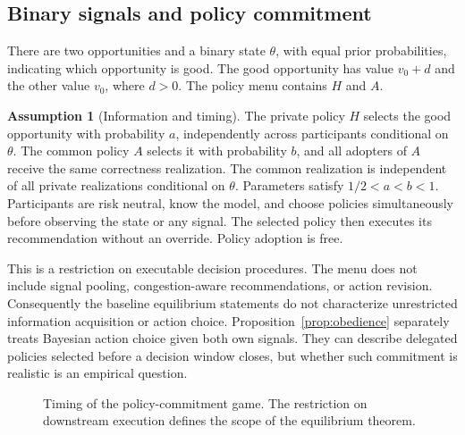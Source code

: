 \documentclass[11pt,a4paper]{article}
\theoremstyle{definition}
\newtheorem{assumption}[theorem]{Assumption}
\theoremstyle{remark}
\begin{document}
\subsection{Binary signals and policy commitment}
There are two opportunities and a binary state $\theta$, with equal prior probabilities, indicating which opportunity is good. The good opportunity has value $v_0+d$ and the other value $v_0$, where $d>0$. The policy menu contains $H$ and $A$.
\begin{assumption}[Information and timing]\label{ass:timing}
The private policy $H$ selects the good opportunity with probability $a$, independently across participants conditional on $\theta$. The common policy $A$ selects it with probability $b$, and all adopters of $A$ receive the same correctness realization. The common realization is independent of all private realizations conditional on $\theta$. Parameters satisfy $1/2<a<b<1$. Participants are risk neutral, know the model, and choose policies simultaneously before observing the state or any signal. The selected policy then executes its recommendation without an override. Policy adoption is free.
\end{assumption}
This is a restriction on executable decision procedures. The menu does not include signal pooling, congestion-aware recommendations, or action revision. Consequently the baseline equilibrium statements do not characterize unrestricted information acquisition or action choice. Proposition~\ref{prop:obedience} separately treats Bayesian action choice given both own signals. They can describe delegated policies selected before a decision window closes, but whether such commitment is realistic is an empirical question.


\begin{figure}[tb]
\centering
{}
\caption{Timing of the policy-commitment game. The restriction on downstream execution defines the scope of the equilibrium theorem.}\label{fig:timing}
\end{figure}
\end{document}

